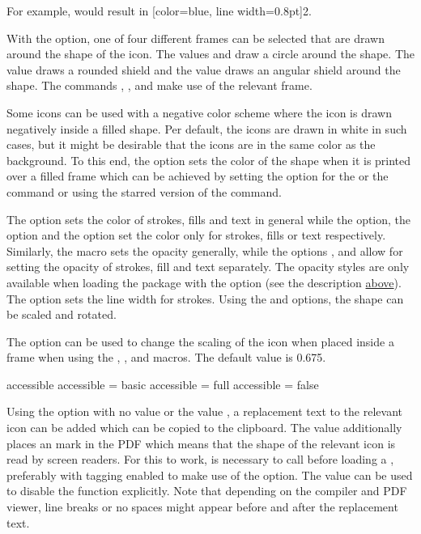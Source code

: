 \documentclass[a4paper]{article}
\begin{document}
For example,  would result in [color=blue, line width=0.8pt]{2}.

With the  option, one of four different frames can be selected that are drawn around the shape of the icon. The values  and  draw a circle around the shape. The value  draws a rounded shield and the value  draws an angular shield around the shape. The commands \macro{\ability}, \macro{\saving}, \macro{\spellschool} and \macro{\damage} make use of the relevant frame.

Some icons can be used with a negative color scheme where the icon is drawn negatively inside a filled shape. Per default, the icons are drawn in white in such cases, but it might be desirable that the icons are in the same color as the background. To this end, the  option sets the color of the shape when it is printed over a filled frame which can be achieved by setting the  option for the \macro{\ability} or the \macro{\spellschool} command or using the starred version of the \macro{\RPGIconsUseIcon} command.

The  option sets the color of strokes, fills and text in general while the  option, the  option and the  option set the color only for strokes, fills or text respectively. Similarly, the  macro sets the opacity generally, while the options ,  and  allow for setting the opacity of strokes, fill and text separately. The opacity styles are only available when loading the package with the  option (see the description \hyperref[macro:opacity]{above}). The option  sets the line width for strokes. Using the  and  options, the shape can be scaled and rotated.

The  option can be used to change the scaling of the icon when placed inside a frame when using the \macro{\ability}, \macro{\saving}, \macro{\spellschool} and \macro{\damage} macros. The default value is 0.675.

\begin{macrodef}
accessible
accessible = basic
accessible = full
accessible = false
\end{macrodef}
Using the  option with no value or the value , a replacement text to the relevant icon can be added which can be copied to the clipboard. The value  additionally places an \macro{\Alt} mark in the PDF which means that the shape of the relevant icon is read by screen readers. For this to work, is necessary to call \macro{\DocumentMetadata{}} before loading a \macro{\documentclass}, preferably with tagging enabled to make use of the  option. The value  can be used to disable the function explicitly. Note that depending on the compiler and PDF viewer, line breaks or no spaces might appear before and after the replacement text.
\end{document}
